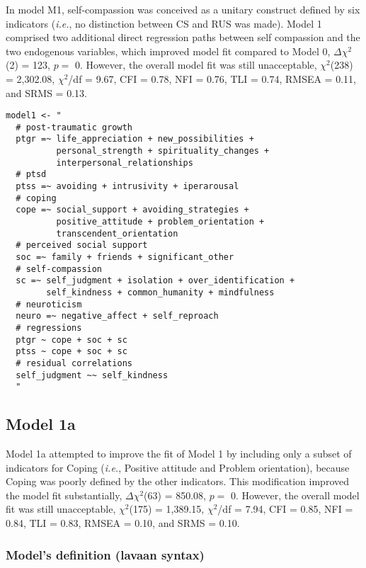 \begin{appendix}
In model M1, self-compassion was conceived as a unitary construct
defined by six indicators (\emph{i.e.}, no distinction between CS and
RUS was made). Model 1 comprised two additional direct regression paths
between self compassion and the two endogenous variables, which improved
model fit compared to Model 0, \(\Delta \chi^2\)(2) = 123, \(p =\) 0.
However, the overall model fit was still unacceptable, \(\chi^2\)(238) =
2,302.08, \(\chi^2\)/df = 9.67, CFI = 0.78, NFI = 0.76, TLI = 0.74,
RMSEA = 0.11, and SRMS = 0.13.

\begin{verbatim}
model1 <- "
  # post-traumatic growth
  ptgr =~ life_appreciation + new_possibilities + 
          personal_strength + spirituality_changes + 
          interpersonal_relationships
  # ptsd
  ptss =~ avoiding + intrusivity + iperarousal
  # coping
  cope =~ social_support + avoiding_strategies + 
          positive_attitude + problem_orientation + 
          transcendent_orientation
  # perceived social support
  soc =~ family + friends + significant_other
  # self-compassion
  sc =~ self_judgment + isolation + over_identification +
        self_kindness + common_humanity + mindfulness
  # neuroticism
  neuro =~ negative_affect + self_reproach
  # regressions
  ptgr ~ cope + soc + sc 
  ptss ~ cope + soc + sc 
  # residual correlations
  self_judgment ~~ self_kindness
  "
\end{verbatim}

\newpage

\hypertarget{model-1a}{%
\subsection{Model 1a}\label{model-1a}}

Model 1a attempted to improve the fit of Model 1 by including only a
subset of indicators for Coping (\emph{i.e.}, Positive attitude and
Problem orientation), because Coping was poorly defined by the other
indicators. This modification improved the model fit substantially,
\(\Delta \chi^2\)(63) = 850.08, \(p =\) 0. However, the overall model
fit was still unacceptable, \(\chi^2\)(175) = 1,389.15, \(\chi^2\)/df =
7.94, CFI = 0.85, NFI = 0.84, TLI = 0.83, RMSEA = 0.10, and SRMS = 0.10.

\hypertarget{models-definition-lavaan-syntax-2}{%
\subsubsection{Model's definition (lavaan
syntax)}\label{models-definition-lavaan-syntax-2}}


\end{appendix}
